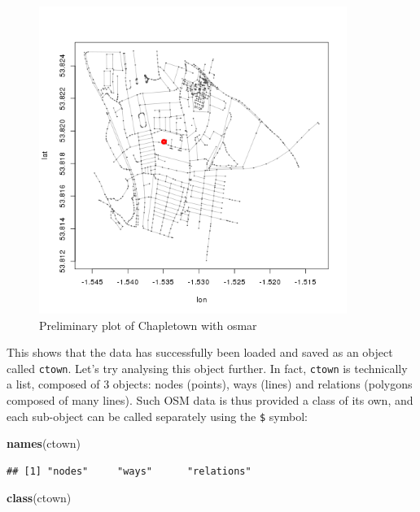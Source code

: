 \documentclass[]{article}
\newenvironment{Shaded}{}{}
\newcommand{\KeywordTok}[1]{\textcolor[rgb]{0.00,0.44,0.13}{\textbf{{#1}}}}
\newcommand{\NormalTok}[1]{{#1}}
\let\Oldincludegraphics\includegraphics
\renewcommand{\includegraphics}[1]{\Oldincludegraphics[width=10cm]{#1}}
\begin{document}
\begin{figure}[htbp]
\centering
\includegraphics{figure/Preliminary_plot_of_Chapletown_with_osmar.png}
\caption{Preliminary plot of Chapletown with osmar}
\end{figure}

This shows that the data has successfully been loaded and saved as an
object called \texttt{ctown}. Let's try analysing this object further.
In fact, \texttt{ctown} is technically a list, composed of 3 objects:
nodes (points), ways (lines) and relations (polygons composed of many
lines). Such OSM data is thus provided a class of its own, and each
sub-object can be called separately using the \texttt{\$} symbol:

\begin{Shaded}
\begin{Highlighting}[]
\KeywordTok{names}\NormalTok{(ctown)}
\end{Highlighting}
\end{Shaded}

\begin{verbatim}
## [1] "nodes"     "ways"      "relations"
\end{verbatim}

\begin{Shaded}
\begin{Highlighting}[]
\KeywordTok{class}\NormalTok{(ctown)}
\end{Highlighting}
\end{Shaded}
\end{document}
